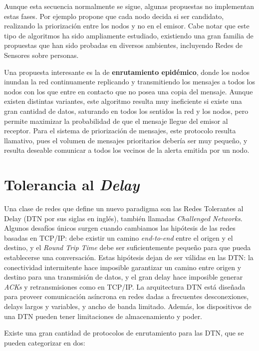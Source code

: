 \documentclass[10pt,preprint,onecolumn]{article}
\begin{document}
Aunque esta secuencia normalmente se sigue, algunas propuestas no implementan estas fases. Por ejemplo \cite{op} propone que cada nodo decida si ser candidato, realizando la priorización entre los nodos y no en el emisor. Cabe notar que este tipo de algoritmos ha sido ampliamente estudiado, existiendo una gran familia de propuestas que han sido probadas en diversos ambientes, incluyendo Redes de Sensores sobre personas\cite{lv1}.

Una propuesta interesante es la de \textbf{enrutamiento epidémico}\cite{epidemic}, donde los nodos inundan la red continuamente replicando y transmitiendo los mensajes a todos los nodos con los que entre en contacto que no posea una copia del mensaje. Aunque existen distintas variantes, este algoritmo resulta muy ineficiente si existe una gran cantidad de datos, saturando en todos los sentidos la red y los nodos, pero permite maximizar la probabilidad de que el mensaje llegue del emisor al receptor. Para el sistema de priorización de mensajes, este protocolo resulta llamativo, pues el volumen de mensajes prioritarios debería ser muy pequeño, y resulta deseable comunicar a todos los vecinos de la alerta emitida por un nodo.

\section{Tolerancia al \emph{Delay}}
\label{sec:delay}

Una clase de redes que define un nuevo paradigma son las Redes Tolerantes al Delay (DTN por sus siglas en inglés), también llamadas \emph{Challenged Networks}\cite{challenged}. Algunos desafíos únicos surgen cuando cambiamos las hipótesis de las redes basadas en TCP/IP: debe existir un camino \emph{end-to-end} entre el origen y el destino, y el \emph{Round Trip Time} debe ser suficientemente pequeño para que pueda establecerse una conversación. Estas hipótesis dejan de ser válidas en las DTN: la conectividad intermitente hace imposible garantizar un camino entre origen y destino para una transmisión de datos, y el gran delay hace imposible generar \emph{ACKs} y retransmisiones como en TCP/IP. La arquitectura DTN está diseñada para proveer comunicación asíncrona en redes dadas a frecuentes desconexiones, delays largos y variables, y ancho de banda limitado. Además, los dispositivos de una DTN pueden tener limitaciones de almacenamiento y poder. 

Existe una gran cantidad de protocolos de enrutamiento para las DTN, que se pueden categorizar en dos\cite{surveydtn}:
\end{document}
